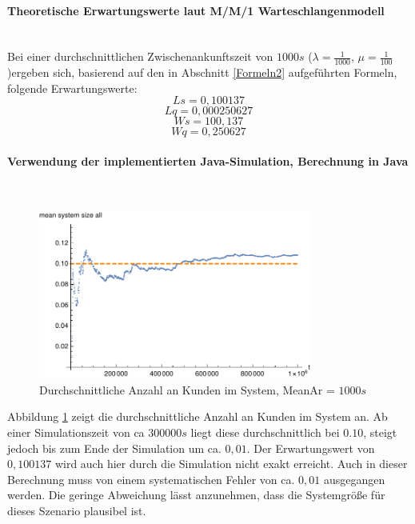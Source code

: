 \paragraph{Theoretische Erwartungswerte laut M/M/1 Warteschlangenmodell}
\\
Bei einer durchschnittlichen Zwischenankunftszeit von $1000s$ ($\lambda=\frac{1}{1000}$, $\mu=\frac{1}{100}$)ergeben sich, basierend auf den in Abschnitt \ref{Formeln2} aufgeführten Formeln, folgende Erwartungswerte:
\begin{equation}
Ls=0,100137
\end{equation}
\begin{equation}
Lq=0,000250627
\end{equation}
\begin{equation}
Ws=100,137
\end{equation}
\begin{equation}
Wq=0,250627
\end{equation}

\paragraph{Verwendung der implementierten Java-Simulation, Berechnung in Java}
\label{JavaTwoPhones1000}
\\
\begin{figure}[htpb]
	\centering
	\includegraphics[width=0.8\textwidth]{abbildungen/2_Phone_VIP/Arrival_1000_Serve_100_dur_1000000_Skip_0/MeanSystemSizeAll.pdf}
	\caption{Durchschnittliche Anzahl an Kunden im System, MeanAr = $1000s$}
	\label{fig:mean3SystemSize1000}
\end{figure}

Abbildung \ref{fig:mean3SystemSize1000} zeigt die durchschnittliche Anzahl an Kunden im System an. Ab einer Simulationszeit von ca $300000s$ liegt diese durchschnittlich bei $0.10$, steigt jedoch bis zum Ende der Simulation um ca. $0,01$. Der Erwartungswert von $0,100137$ wird auch hier durch die Simulation nicht exakt erreicht. Auch in dieser Berechnung muss von einem systematischen Fehler von ca. $0,01$ ausgegangen werden. Die geringe Abweichung lässt anzunehmen, dass die Systemgröße für dieses Szenario plausibel ist.

